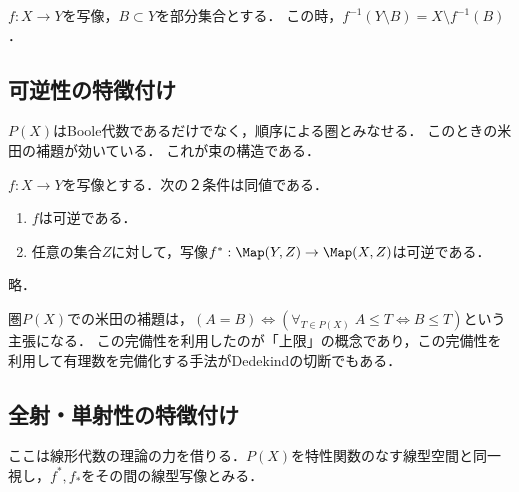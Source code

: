 \documentclass[uplatex,dvipdfmx]{jsreport}
\begin{document}
\begin{proposition}[逆像は補集合を保つ]
    $f:X\to Y$を写像，$B\subset Y$を部分集合とする．
    この時，$f^{-1}(Y\setminus B)=X\setminus f^{-1}(B)$．
\end{proposition}

\subsection{可逆性の特徴付け}

\begin{tcolorbox}[colframe=ForestGreen, colback=ForestGreen!10!white,breakable,colbacktitle=ForestGreen!40!white,coltitle=black,fonttitle=\bfseries\sffamily,
title=]
    $P(X)$はBoole代数であるだけでなく，順序による圏とみなせる．
    このときの米田の補題が効いている．
    これが束の構造である．
\end{tcolorbox}

\begin{proposition}
    $f:X\to Y$を写像とする．次の２条件は同値である．
    \begin{enumerate}
        \item $f$は可逆である．
        \item 任意の集合$Z$に対して，写像$f^*:\Map(Y,Z)\to\Map(X,Z)$は可逆である．
    \end{enumerate}
\end{proposition}
\begin{Proof}
    略．
\end{Proof}

\begin{remarks}
    圏$P(X)$での米田の補題は，$(A=B)\Leftrightarrow(\forall_{T\in P(X)}\;A\le T\Leftrightarrow B\le T)$という主張になる．
    この完備性を利用したのが「上限」の概念であり，この完備性を利用して有理数を完備化する手法がDedekindの切断でもある．
\end{remarks}

\subsection{全射・単射性の特徴付け}

\begin{tcolorbox}[colframe=ForestGreen, colback=ForestGreen!10!white,breakable,colbacktitle=ForestGreen!40!white,coltitle=black,fonttitle=\bfseries\sffamily,
title=]
    ここは線形代数の理論の力を借りる．$P(X)$を特性関数のなす線型空間と同一視し，$f^*,f_*$をその間の線型写像とみる．
\end{tcolorbox}
\end{document}
